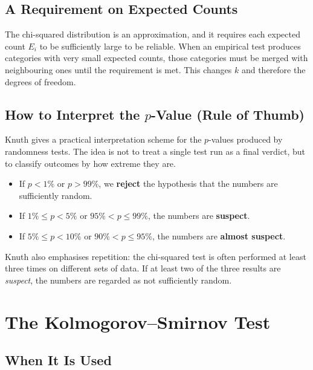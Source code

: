 \subsection{A Requirement on Expected Counts}
 
The chi-squared distribution is an approximation, and it requires each
expected count $E_i$ to be sufficiently large to be reliable.  When an
empirical test produces categories with very small expected counts, those
categories must be merged with neighbouring ones until the requirement is
met.  This changes $k$ and therefore the degrees of freedom.
 
\subsection{How to Interpret the $p$-Value (Rule of Thumb)}

Knuth gives a practical interpretation scheme for the $p$-values produced by
randomness tests.\cite{knuth:1997-taocp-2}  The idea is not to treat a single
test run as a final verdict, but to classify outcomes by how extreme they are.

\begin{itemize}
  \item If $p < 1\%$ or $p > 99\%$, we \textbf{reject} the hypothesis that the
        numbers are sufficiently random.
  \item If $1\% \le p < 5\%$ or $95\% < p \le 99\%$, the numbers are
        \textbf{suspect}.
  \item If $5\% \le p < 10\%$ or $90\% < p \le 95\%$, the numbers are
        \textbf{almost suspect}.
\end{itemize}

Knuth also emphasises repetition: the chi-squared test is often performed at
least three times on different sets of data.  If at least two of the three
results are \emph{suspect}, the numbers are regarded as not sufficiently
random.\cite{knuth:1997-taocp-2}

\section{The Kolmogorov--Smirnov Test}\label{sec:ks-test}

\subsection{When It Is Used}
 
